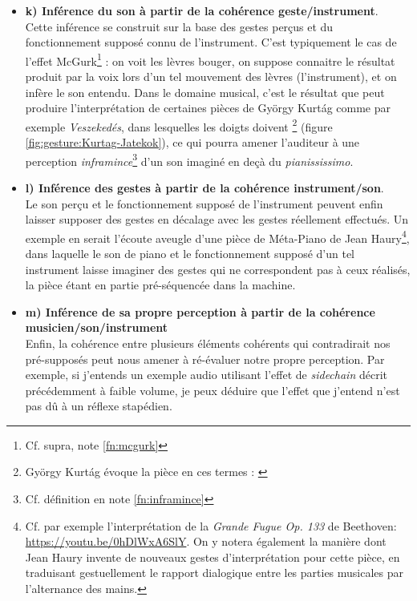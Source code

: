 \begin{itemize}[noitemsep]
	\item \textbf{k) Inférence du son à partir de la cohérence geste/instrument}.\\
	Cette inférence se construit sur la base des gestes perçus et du fonctionnement supposé connu de l'instrument. C'est typiquement le cas de l'effet McGurk\footnote{Cf. supra, note \ref{fn:mcgurk}} : on voit les lèvres bouger, on suppose connaitre le résultat produit par la voix lors d'un tel mouvement des lèvres (l'instrument), et on infère le son entendu. Dans le domaine musical, c'est le résultat que peut produire l'interprétation de certaines pièces de György Kurtág comme par exemple \textit{Veszekedés}, dans lesquelles les doigts doivent \footnote{György Kurtág évoque la pièce en ces termes :  \cite{kurtag_gyorgy_2018}} (figure \ref{fig:gesture:Kurtag-Jatekok}), ce qui pourra amener l'auditeur à une perception \textit{inframince}\footnote{Cf. définition en note \ref{fn:inframince}} d'un son imaginé en deçà du \textit{pianississimo}.

	\item \textbf{l) Inférence des gestes à partir de la cohérence instrument/son}.\\
	Le son perçu et le fonctionnement supposé de l'instrument peuvent enfin laisser supposer des gestes en décalage avec les gestes réellement effectués. Un exemple en serait l'écoute aveugle d'une pièce de Méta-Piano de Jean Haury\footnote{Cf. par exemple l'interprétation de la \textit{Grande Fugue Op. 133} de Beethoven: \url{https://youtu.be/0hDlWxA6SlY}. On y notera également la manière dont Jean Haury invente de nouveaux gestes d'interprétation pour cette pièce, en traduisant gestuellement le rapport dialogique entre les parties musicales par l'alternance des mains.}, dans laquelle le son de piano et le fonctionnement supposé d'un tel instrument laisse imaginer des gestes qui ne correspondent pas à ceux réalisés, la pièce étant en partie pré-séquencée dans la machine.
	\item \textbf{m) Inférence de sa propre perception à partir de la cohérence musicien/son/instrument}\\
	Enfin, la cohérence entre plusieurs éléments cohérents qui contradirait nos pré-supposés peut nous amener à ré-évaluer notre propre perception. Par exemple, si j'entends un exemple audio utilisant l'effet de \textit{sidechain} décrit précédemment à faible volume, je peux déduire que l'effet que j'entend n'est pas dû à un réflexe stapédien.
\end{itemize}
